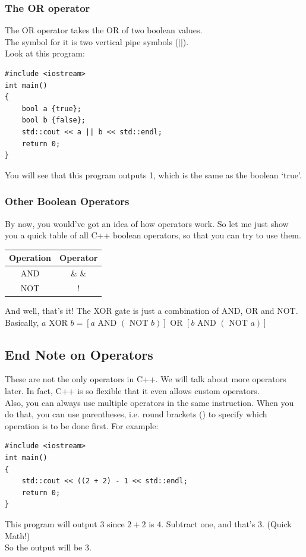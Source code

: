 \documentclass[letterpaper, 12pt]{book}
\begin{document}
\subsubsection{The OR operator}
The OR operator takes the OR of two boolean values.\\
The symbol for it is two vertical pipe symbols ($||$).\\
Look at this program:
\begin{lstlisting}
#include <iostream>
int main()
{
	bool a {true};
	bool b {false};
	std::cout << a || b << std::endl;
	return 0;
}
\end{lstlisting}
You will see that this program outputs 1, which is the same as the boolean `true'.
\subsubsection{Other Boolean Operators}
By now, you would've got an idea of how operators work. So let me just show you a quick table of all C++ boolean operators, so that you can try to use them.
\begin{center}
	\begin{tabular}{ |c|c| } 
		\hline
		Operation & Operator\\
		\hline
		AND & \& \& \\ 
		NOT & $!$ \\
		\hline
	\end{tabular}
\end{center}
And well, that's it! The XOR gate is just a combination of AND, OR and NOT.\\
Basically, $a \text{ XOR } b = [a \text{ AND } (\text{ NOT } b )] \text{ OR } [b \text{ AND } (\text{ NOT } a )]$\\
\subsection{End Note on Operators}
These are not the only operators in C++. We will talk about more operators later. In fact, C++ is so flexible that it even allows custom operators.\\
Also, you can always use multiple operators in the same instruction. When you do that, you can use parentheses, i.e. round brackets () to specify which operation is to be done first. For example:
\begin{lstlisting}
#include <iostream>
int main()
{
	std::cout << ((2 + 2) - 1 << std::endl;
	return 0;
}
\end{lstlisting}
This program will output 3 since $2 + 2$ is $4$. Subtract one, and that's $3$. (Quick Math!)\\
So the output will be 3.
\end{document}
